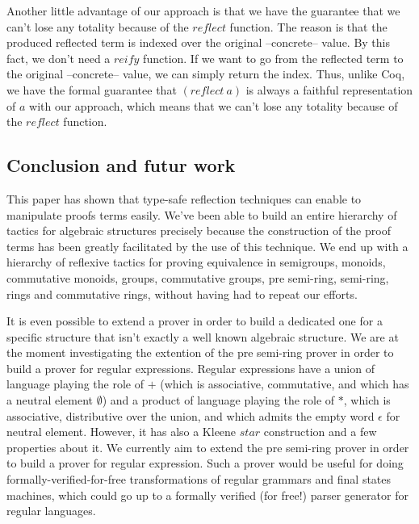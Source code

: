 Another little advantage of our approach is that we have the guarantee that we can't lose any totality because of the $reflect$ function. The reason is that the produced reflected term is indexed over the original --concrete-- value. By this fact, we don't need a $reify$ function. If we want to go from the reflected term to the original --concrete-- value, we can simply return the index. Thus, unlike Coq, we have the formal guarantee that $(reflect\ a)$ is always a faithful representation of $a$ with our approach, which means that we can't lose any totality because of the $reflect$ function.


	\subsection {Conclusion and futur work}
	
This paper has shown that type-safe reflection techniques can enable to manipulate proofs terms easily. We've been able to build an entire hierarchy of tactics for algebraic structures precisely because the construction of the proof terms has been greatly facilitated by the use of this technique. We end up with a hierarchy of reflexive tactics for proving equivalence in semigroups, monoids, commutative monoids, groups, commutative groups, pre semi-ring, semi-ring, rings and commutative rings, without having had to repeat our efforts.

It is even possible to extend a prover in order to build a dedicated one for a specific structure that isn't exactly a well known algebraic structure. We are at the moment investigating the extention of the pre semi-ring prover in order to build a prover for regular expressions. Regular expressions have a union of language playing the role of $+$ (which is associative, commutative, and which has a neutral element $\emptyset$) and a product of language playing the role of $*$, which is associative, distributive over the union, and which admits the empty word $\epsilon$ for neutral element. However, it has also a Kleene $star$ construction and a few properties about it. We currently aim to extend the pre semi-ring prover in order to build a prover for regular expression. Such a prover would be useful for doing formally-verified-for-free transformations of regular grammars and final states machines, which could go up to a formally verified (for free!) parser generator for regular languages.



